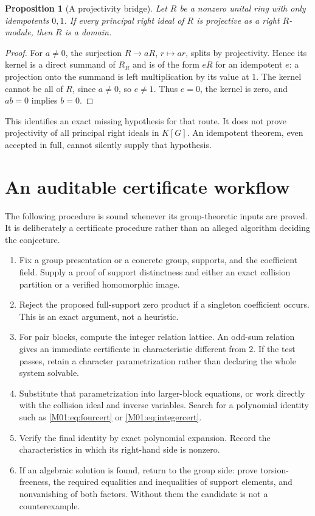 \documentclass[11pt,a4paper,oneside]{report}
\newtheorem{proposition}[theorem]{Proposition}
\theoremstyle{definition}
\theoremstyle{remark}
\begin{document}
\begin{proposition}[A projectivity bridge]\label{M01:prop:projectivity}
Let $R$ be a nonzero unital ring with only idempotents $0,1$.
If every principal right ideal of $R$ is projective as a right
$R$-module, then $R$ is a domain.
\end{proposition}
\begin{proof}
For $a\ne0$, the surjection $R\to aR$, $r\mapsto ar$, splits by
projectivity. Hence its kernel is a direct summand of $R_R$ and is of
the form $eR$ for an idempotent $e$: a projection onto the summand is
left multiplication by its value at $1$. The kernel cannot be all of
$R$, since $a\ne0$, so $e\ne1$. Thus $e=0$, the kernel is zero,
and $ab=0$ implies $b=0$.
\end{proof}

This identifies an exact missing hypothesis for that route. It does not
prove projectivity of all principal right ideals in $K[G]$. An idempotent
theorem, even accepted in full, cannot silently supply that hypothesis.

\section{An auditable certificate workflow}

The following procedure is sound whenever its group-theoretic inputs are
proved. It is deliberately a certificate procedure rather than an alleged
algorithm deciding the conjecture.

\begin{enumerate}
\item Fix a group presentation or a concrete group, supports, and the
coefficient field. Supply a proof of support distinctness and either an
exact collision partition or a verified homomorphic image.
\item Reject the proposed full-support zero product if a singleton
coefficient occurs. This is an exact argument, not a heuristic.
\item For pair blocks, compute the integer relation lattice. An odd-sum
relation gives an immediate certificate in characteristic different
from $2$. If the test passes, retain a character parametrization rather
than declaring the whole system solvable.
\item Substitute that parametrization into larger-block equations, or
work directly with the collision ideal and inverse variables. Search
for a polynomial identity such as \eqref{M01:eq:fourcert} or
\eqref{M01:eq:integercert}.
\item Verify the final identity by exact polynomial expansion. Record
the characteristics in which its right-hand side is nonzero.
\item If an algebraic solution is found, return to the group side:
prove torsion-freeness, the required equalities and inequalities of
support elements, and nonvanishing of both factors. Without them the
candidate is not a counterexample.
\end{enumerate}
\end{document}
